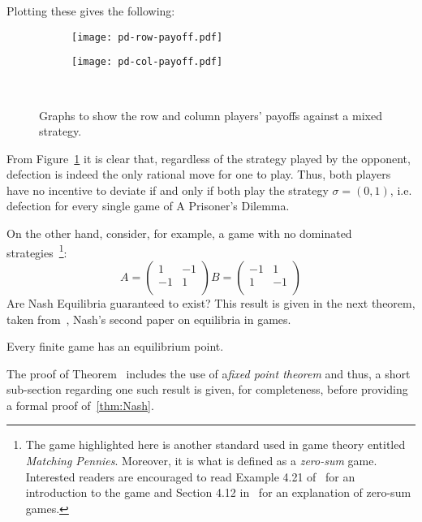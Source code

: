 Plotting these gives the following:
\begin{figure}[h]
    \centering
        \begin{subfigure}[t]{0.45\textwidth}
        \centering
            \texttt{[image: pd-row-payoff.pdf]}
        \end{subfigure}
    \hfill
        \begin{subfigure}[t]{0.45\textwidth}
        \centering
            \texttt{[image: pd-col-payoff.pdf]}
        \end{subfigure}~\caption{Graphs to show the row and column players' payoffs against a mixed strategy.}
    \label{fig:mixed_strategy_PD}
    \end{figure}
From Figure~\ref{fig:mixed_strategy_PD} it is clear that, regardless of the
strategy played by the opponent, defection is indeed the only rational move for
one to play. Thus, both players have no incentive to deviate if and only if both
play the strategy \(\sigma=(0, 1)\), i.e. defection for every single game of A
Prisoner's Dilemma.

On the other hand, consider, for example, a game with no dominated
strategies~\footnote{The game highlighted here is another standard used in game
theory entitled \emph{Matching Pennies}. Moreover, it is what is defined as a
\emph{zero-sum} game. Interested readers are encouraged to read Example 4.21
of~\cite{Webb2007} for an introduction to the game and Section 4.12
in~\cite{maschler_solan_zamir_2013} for an explanation of zero-sum games.}:
\[
    A =
    \begin{pmatrix}
        1 & -1\\
        -1 & 1\\
    \end{pmatrix}

    B =
    \begin{pmatrix}
        -1 & 1\\
        1 & -1\\
    \end{pmatrix}
\]
Are Nash Equilibria guaranteed to exist? This result is given in the next
theorem, taken from~\cite{nash1951non}, Nash's second paper on equilibria in games.

\begin{theorem}\label{thm:Nash}
    Every finite game has an equilibrium point.
\end{theorem}

The proof of Theorem~\label{thm:Nash} includes the use of a\emph{fixed point
theorem} and thus, a short sub-section regarding one such result is given, for
completeness, before providing a formal proof of~\ref{thm:Nash}.

